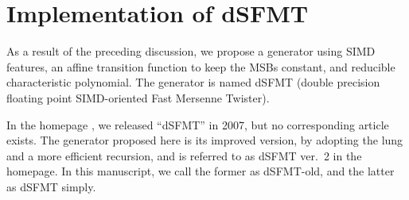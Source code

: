 \documentclass{svmult}
\begin{document}





\section{Implementation of dSFMT}
\label{sec:implement}
As a result of the preceding discussion, 
we propose a generator using SIMD features, an affine transition function
to keep the MSBs constant,
and reducible characteristic polynomial. 
The generator is named dSFMT (double precision
floating point SIMD-oriented Fast Mersenne Twister).
\begin{remark}
In the homepage \cite{web:SFMT}, 
we released ``dSFMT'' in 2007,
but no corresponding article exists.
The generator proposed here is its improved version, by
adopting the lung and a more efficient recursion, and 
is referred to as dSFMT ver.\ 2 in the homepage.
In this manuscript, we call the former as dSFMT-old,
and the latter as dSFMT simply.
\end{remark}
\end{document}
